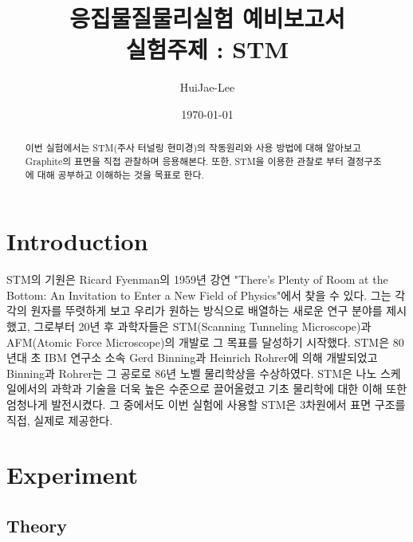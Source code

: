\documentclass[aps,reprint,superscriptaddress,11pt]{revtex4-2}
\begin{document}
\title{응집물질물리실험 예비보고서 \\
\small 실험주제 : STM}

\author{HuiJae-Lee}
\date{\today}


\begin{abstract}
 이번 실험에서는 STM(주사 터널링 현미경)의 작동원리와 사용 방법에 대해 알아보고 
 Graphite의 표면을 직접 관찰하며 응용해본다. 또한, STM을 이용한 관찰로 부터 결정구조에 대해
 공부하고 이해하는 것을 목표로 한다.
\end{abstract}

\maketitle

\section[Introduction]{Introduction}
STM의 기원은 Ricard Fyenman의 1959년 강연 "There's Plenty of Room at the Bottom: 
An Invitation to Enter a New Field of Physics"에서 찾을 수 있다. 그는 각각의 
원자를 뚜렷하게 보고 우리가 원하는 방식으로 배열하는 새로운 연구 분야를 
제시했고, 그로부터 20년 후 과학자들은 STM(Scanning Tunneling Microscope)과 
AFM(Atomic Force Microscope)의 개발로 그 목표를 달성하기 시작했다. 
STM은 80년대 초 IBM 연구소 소속 Gerd Binning과 Heinrich Rohrer에 의해 개발되었고 
Binning과 Rohrer는 그 공로로 86년 노벨 물리학상을 수상하였다.
STM은 나노 스케일에서의 과학과 기술을 더욱 높은 수준으로 끌어올렸고 기초 물리학에 대한 
이해 또한 엄청나게 발전시켰다. 그 중에서도 이번 실험에 사용할 STM은 3차원에서 표면 구조를 
직접, 실제로 제공한다.
\section[Experiment]{Experiment}
\subsection{Theory}
\end{document}
